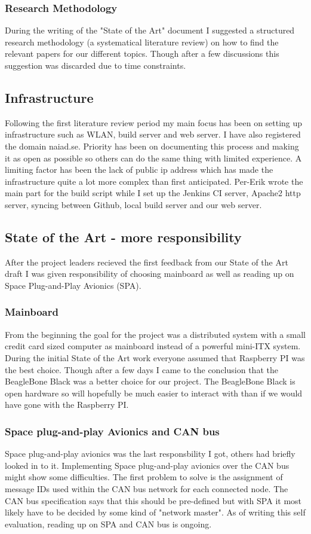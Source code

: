 \subsubsection{Research Methodology}
During the writing of the "State of the Art" document I suggested a structured
research methodology (a systematical literature review) on how to find the relevant
papers for our different topics. Though after a few discussions this
suggestion was discarded due to time constraints.

\subsection{Infrastructure}
Following the first literature review period my main focus has been on setting
up infrastructure such as WLAN, build server and web server.
I have also registered the domain naiad.se. Priority has been
on documenting this process and making it as open as possible so others can do
the same thing with limited experience.
A limiting factor has been the lack of public ip address which has
made the infrastructure quite a lot more complex than first anticipated.
Per-Erik wrote the main part for the build script while I set up the Jenkins
CI server, Apache2 http server, syncing between Github, local build server and our web
server.

\subsection{State of the Art - more responsibility}
After the project leaders recieved the first feedback from our State of the Art
draft I was given responsibility of choosing mainboard as well as reading up on
Space Plug-and-Play Avionics (SPA).

\subsubsection{Mainboard}
From the beginning the goal for the project was a distributed system with a
small credit card sized computer as mainboard instead of a powerful mini-ITX
system. During the initial State of the Art work everyone assumed that
Raspberry PI was the best choice. Though after a few days I came to the
conclusion that the BeagleBone Black was a better choice for our project.
The BeagleBone Black is open hardware so will hopefully be much easier to
interact with than if we would have gone with the Raspberry PI.

\subsubsection{Space plug-and-play Avionics and CAN bus}
Space plug-and-play avionics was the last responsbility I got, others had briefly
looked in to it. Implementing Space plug-and-play avionics
over the CAN bus might show some difficulties. The first problem to solve is
the assignment of message IDs used within the CAN bus network for each connected
node. The CAN bus specification says that this should be pre-defined but with
SPA it most likely have to be decided by some kind of "network master". As of
writing this self evaluation, reading up on SPA and CAN bus is ongoing.

